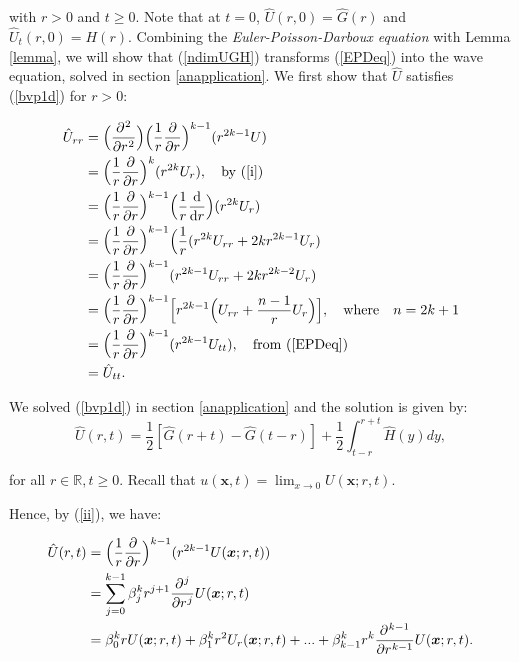 \documentclass[a4paper, 12pt]{article}
\numberwithin{equation}{section}
\begin{document}
with $r>0$ and $t \ge 0$. Note that at $t=0$, $\hat{U}(r,0)=\hat{G}(r)$ and
$\hat{U}_t(r,0)=H(r)$. Combining the \emph{Euler-Poisson-Darboux equation} with
Lemma \ref{lemma}, we will show that (\ref{ndimUGH}) transforms (\ref{EPDeq})
into the wave equation, solved in section \ref{anapplication}. We first show
that $\hat{U}$ satisfies (\ref{bvp1d}) for $r>0$:

\begin{equation*}
    \begin{aligned}
        \hat{U}_{rr}&=\Big(\diffp[2]{}{r}\Big)\Big(\frac{1}{r} \diffp[1]{}{r}\Big)^{k-1}(r^{2k-1}U)\\
        &=\Big(\frac{1}{r} \diffp[1]{}{r}\Big)^k(r^{2k}U_r), \quad \textrm{by (\ref{i})}\\
        &=\Big(\frac{1}{r} \diffp[1]{}{r}\Big)^{k-1}\Big(\frac{1}{r}\diff{}{r}\Big)(r^{2k}U_r)\\
        &=\Big(\frac{1}{r} \diffp[1]{}{r}\Big)^{k-1}\Big(\frac{1}{r}(r^{2k}U_{rr}+2kr^{2k-1}U_r)\\
        &=\Big(\frac{1}{r} \diffp[1]{}{r}\Big)^{k-1}(r^{2k-1}U_{rr}+2kr^{2k-2}U_r)\\
        &=\Big(\frac{1}{r} \diffp[1]{}{r}\Big)^{k-1}\Big[r^{2k-1}\Big(U_{rr}+\frac{n-1}{r}U_r\Big)\Big], \quad \textrm{where} \quad n=2k+1\\
        &=\Big(\frac{1}{r} \diffp[1]{}{r}\Big)^{k-1}(r^{2k-1}U_{tt}), \quad \textrm{from (\ref{EPDeq})}\\
        &=\hat{U}_{tt}.
    \end{aligned}
\end{equation*}

We solved (\ref{bvp1d}) in section \ref{anapplication} and the solution is given
by: 
\begin{equation}\label{nomorelabels}
    \hat{U}(r,t)=\frac{1}{2}[\hat{G}(r+t)-\hat{G}(t-r)]+\frac{1}{2}\int_{t-r}^{r+t}\hat{H}(y)dy,
\end{equation}

for all $r\in\mathbb{R}, t \ge 0$. Recall that $u(\boldsymbol{x},t)=\lim_{x
\rightarrow 0} U(\boldsymbol{x}; r, t)$.

Hence, by (\ref{ii}), we have:

\begin{equation*}
    \begin{aligned}
        \hat{U}(r,t)&=\Big(\frac{1}{r} \diffp[1]{}{r}\Big)^{k-1}(r^{2k-1}U(\boldsymbol{x};r,t))\\
        &=\sum_{j=0}^{k-1}\beta_j^k r^{j+1} \diffp[j]{}{r}U(\boldsymbol{x};r,t)\\ 
        &=\beta_0^k rU(\boldsymbol{x};r,t)+\beta_1^k r^2U_r(\boldsymbol{x};r,t)+...+\beta_{k-1}^k r^k\diffp[k-1]{}{r}U(\boldsymbol{x};r,t).
    \end{aligned}
\end{equation*}
\end{document}
